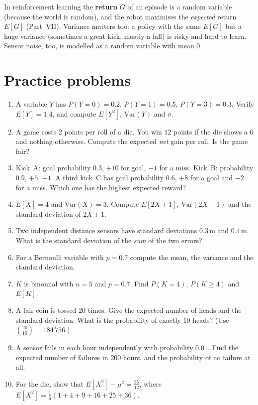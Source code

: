 \begin{aibox}
In reinforcement learning the \textbf{return} $G$ of an episode is a random variable (because the world is random), and the robot maximises the \emph{expected} return $E[G]$ (Part~VII). Variance matters too: a policy with the same $E[G]$ but a huge variance (sometimes a great kick, mostly a fall) is risky and hard to learn. Sensor noise, too, is modelled as a random variable with mean $0$.
\end{aibox}

\section*{Practice problems}
\begin{enumerate}[label=\textbf{\thechapter.\arabic*}]
  \item A variable $Y$ has $P(Y=0)=0.2$, $P(Y=1)=0.5$, $P(Y=3)=0.3$. Verify $E[Y]=1.4$, and compute $E[Y^2]$, $\mathrm{Var}(Y)$ and $\sigma$.
  \item A game costs $2$ points per roll of a die. You win $12$ points if the die shows a $6$ and nothing otherwise. Compute the expected \emph{net} gain per roll. Is the game fair?
  \item Kick~A: goal probability $0.3$, $+10$ for goal, $-1$ for a miss. Kick~B: probability $0.9$, $+5$, $-1$. A third kick~C has goal probability $0.6$, $+8$ for a goal and $-2$ for a miss. Which one has the highest expected reward?
  \item $E[X]=4$ and $\mathrm{Var}(X)=3$. Compute $E[2X+1]$, $\mathrm{Var}(2X+1)$ and the standard deviation of $2X+1$.
  \item Two independent distance sensors have standard deviations $0.3$\,m and $0.4$\,m. What is the standard deviation of the \emph{sum} of the two errors?
  \item For a Bernoulli variable with $p=0.7$ compute the mean, the variance and the standard deviation.
  \item $K$ is binomial with $n=5$ and $p=0.7$. Find $P(K=4)$, $P(K\ge4)$ and $E[K]$.
  \item A fair coin is tossed $20$ times. Give the expected number of heads and the standard deviation. What is the probability of exactly $10$ heads? (Use $\binom{20}{10}=184\,756$.)
  \item A sensor fails in each hour independently with probability $0.01$. Find the expected number of failures in $200$ hours, and the probability of no failure at all.
  \item[\textbf{\thechapter.10}$\star$] For the die, show that $E[X^2]-\mu^2=\frac{35}{12}$, where $E[X^2]=\frac16(1+4+9+16+25+36)$.
\end{enumerate}
